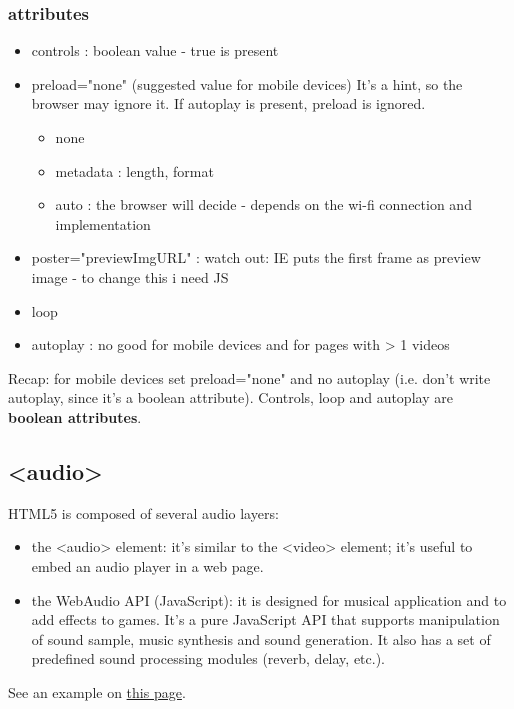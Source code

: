\documentclass[a4paper,11pt]{book}
\begin{document}
        \subsubsection{attributes}
        \begin{itemize}
            \item controls : boolean value - true is present
            \item preload="none" (suggested value for mobile devices)
                It's a hint, so the browser may ignore it. If autoplay is present, preload is ignored.
                \begin{itemize}
                    \item none
                    \item metadata : length, format
                    \item auto : the browser will decide - depends on the wi-fi connection and implementation
                \end{itemize}
            \item poster="previewImgURL" : watch out: IE puts the first frame as preview image - to change this i need JS
            \item loop 
            \item autoplay : no good for mobile devices and for pages with > 1 videos
        \end{itemize}
        Recap: for mobile devices set preload="none" and no autoplay (i.e. don't write autoplay, since it's a boolean attribute).
        Controls, loop and autoplay are \textbf{boolean attributes}.

        \subsection{<audio>}
        HTML5 is composed of several audio layers:
        \begin{itemize}
            \item the <audio> element: it's similar to the <video> element; it's useful to embed an audio player in a web page.
            \item the WebAudio API (JavaScript): 
            it is designed for musical application and to add effects to games. It's a pure JavaScript
            API that supports manipulation of sound sample, music synthesis and sound generation. It also has a set of
            predefined sound processing modules (reverb, delay, etc.).
        \end{itemize}
        See an example on
        \href{http://pdata.altervista.org/HTML5/audio/audio.html}{this page}.
\end{document}
